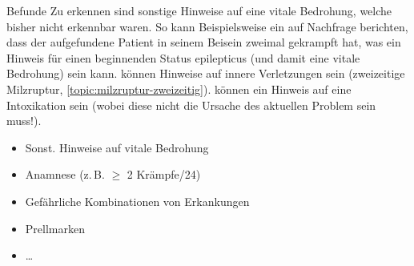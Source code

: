 \TextSlide
{{\eye} Befunde}
{Zu erkennen sind sonstige Hinweise auf
eine vitale Bedrohung, welche bisher nicht erkennbar waren.
So kann Beispielsweise ein  auf Nachfrage
berichten, dass der aufgefundene Patient in seinem Beisein
zweimal gekrampft hat, was ein Hinweis für einen
beginnenden Status epilepticus (und damit eine vitale
Bedrohung) sein kann.  können Hinweise auf
innere Verletzungen sein (zweizeitige Milzruptur,
\ref{topic:milzruptur-zweizeitig}).  können ein
Hinweis auf eine Intoxikation sein (wobei diese nicht die
Ursache des aktuellen Problem sein muss!).
}
{
\begin{itemize}
  \item Sonst. Hinweise auf vitale Bedrohung
  \item Anamnese (z.\,B.
  $\geq$ 2 Krämpfe/24\Hour*)
  \item Gefährliche Kombinationen von
  Erkankungen
  \item Prellmarken
  \item \ldots 
\end{itemize}
}
{}
{}
{}
\clearpage
\subsection{{\FontKeyboardFamily{=}} }



